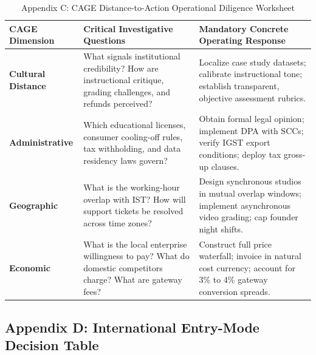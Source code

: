 \begin{table}[t]
\centering
\small
\caption{Appendix C: CAGE Distance-to-Action Operational Diligence Worksheet}
\label{tab:app_cage_worksheet}
\begin{tabularx}{\textwidth}{p{2.6cm} p{4.6cm} X}
\toprule
\textbf{CAGE Dimension} & \textbf{Critical Investigative Questions} & \textbf{Mandatory Concrete Operating Response} \\
\midrule
\textbf{Cultural Distance} & What signals institutional credibility? How are instructional critique, grading challenges, and refunds perceived? & Localize case study datasets; calibrate instructional tone; establish transparent, objective assessment rubrics. \\
\textbf{Administrative} & Which educational licenses, consumer cooling-off rules, tax withholding, and data residency laws govern? & Obtain formal legal opinion; implement DPA with SCCs; verify IGST export conditions; deploy tax gross-up clauses. \\
\textbf{Geographic} & What is the working-hour overlap with IST? How will support tickets be resolved across time zones? & Design synchronous studios in mutual overlap windows; implement asynchronous video grading; cap founder night shifts. \\
\textbf{Economic} & What is the local enterprise willingness to pay? What do domestic competitors charge? What are gateway fees? & Construct full price waterfall; invoice in natural cost currency; account for 3\% to 4\% gateway conversion spreads. \\
\bottomrule
\end{tabularx}
\end{table}

\subsection{Appendix D: International Entry-Mode Decision Table}

